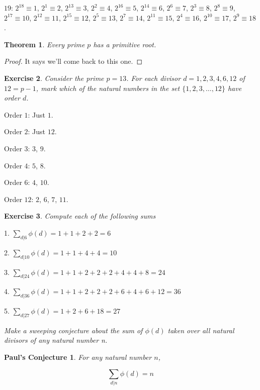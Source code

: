 \documentclass{article}
\newtheorem{thm}{Theorem}[section]
\newtheorem{ex}[thm]{Exercise}
\newtheorem{PC}{Paul's Conjecture}
\numberwithin{equation}{thm}
\begin{document}
$19$: $2^{18} \equiv 1$, $2^1 \equiv 2$, $2^{13} \equiv 3$, $2^2 \equiv 4$, $2^{16} \equiv 5$, $2^{14} \equiv 6$, $2^6 \equiv 7$, $2^3 \equiv 8$,
$2^8 \equiv 9$, $2^{17} \equiv 10$, $2^{12} \equiv 11$, $2^{15} \equiv 12$, $2^5 \equiv 13$, $2^7 \equiv 14$, $2^{11} \equiv 15$, $2^4 \equiv 16$,
$2^{10} \equiv 17$, $2^9 \equiv 18$.



\begin{thm} \label{6.8}
  Every prime $p$ has a primitive root.
\end{thm}

\begin{proof}
  It says we'll come back to this one.
\end{proof}



\begin{ex} \label{6.9}
  Consider the prime $p = 13$. For each divisor $d = 1, 2, 3, 4, 6, 12$ of $12 = p-1$, mark which of the natural numbers in the set $\{1, 2, 3, \ldots, 12\}$ have order $d$.
\end{ex}

Order $1$: Just $1$.

Order $2$: Just $12$.

Order $3$: $3$, $9$.

Order $4$: $5$, $8$.

Order $6$: $4$, $10$.

Order $12$: $2$, $6$, $7$, $11$.



\begin{ex} \label{6.10}
  Compute each of the following sums
\end{ex}

1. $\sum_{d | 6} \phi(d) = 1 + 1 + 2 + 2 = 6$

2. $\sum_{d|10} \phi(d) = 1 + 1 + 4 + 4 = 10$

3. $\sum_{d|24} \phi(d) = 1 + 1 + 2 + 2 + 2 + 4 + 4 + 8 = 24$

4. $\sum_{d|36} \phi(d) = 1 + 1 + 2 + 2 + 2 + 6 + 4 + 6 + 12 = 36$

5. $\sum_{d|27} \phi(d) = 1 + 2 + 6 + 18 = 27$

\emph{Make a sweeping conjecture about the sum of $\phi(d)$ taken over all natural divisors of any natural number n.}

\begin{PC} \label{PC 6.18}
  For any natural number $n$,

  $$\sum_{d | n} \phi(d) = n$$
\end{PC}
\end{document}

